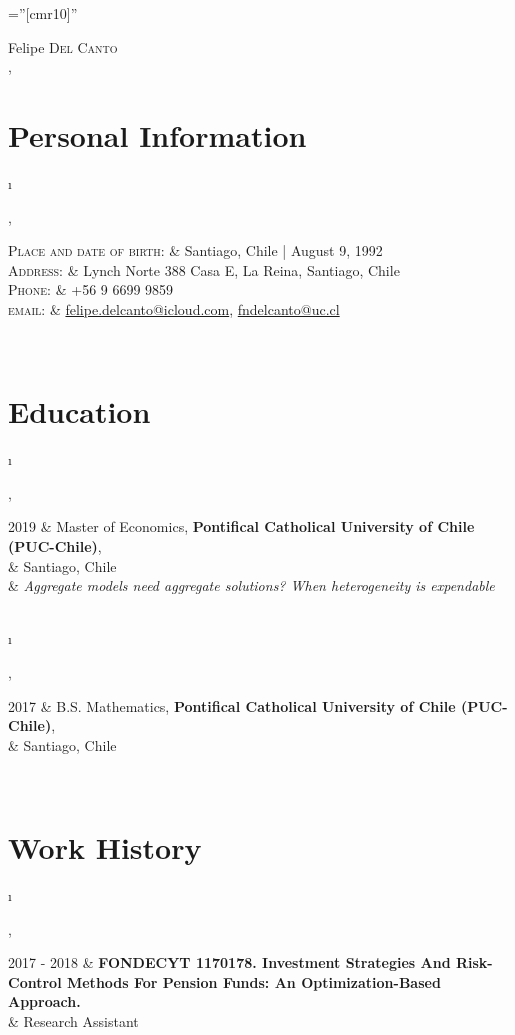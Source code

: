 \documentclass[a4paper,10pt]{article}
\newcommand{\tablength}{}
\newcommand{\setTabParams}[1]{\renewcommand\tablength{}\forcsvlist{\listadd\tablength}{#1}}
\newcommand{\setCols}[1]{			%
	\ifnum0=\i						%
		\ifdim0cm=#1				%
			\def \firstCol {r}		%
		\else						%
			\def \firstCol {p{#1}}		%
		\fi						%
	\else \ifnum1=\i				%
		\ifdim0cm=#1				%
			\def \secondCol {l}		%
		\else						%
			\def \secondCol{p{#1}}	%
		\fi						%
	\else \ifnum2=\i				%
		\ifnum0=#1				%
			\def \sep {}			%
		\else						%
			\def \sep {|}			%
		\fi						%
	\fi \fi \fi						%
	\advance\i by1					%
}
\newcommand{\tab}[1]{					%
	\newcount\i						%
	\forlistloop{\setCols}{\tablength}		%
	\begin{tabular}{\firstCol \sep \secondCol}	%
		#1							%
	\end{tabular} \\						%
}
\begin{document}
\pagestyle{empty} %

\font\fb=''[cmr10]'' %

\par{\centering
		{{\Huge Felipe \textsc{Del Canto}}	\\
		 {\large \monthname, \the\year }
	}\par}

\section{Personal Information}
\setTabParams{0cm,0cm,0}

\tab{
    \textsc{Place and date of birth:}	&	Santiago, Chile  | August 9, 1992								\\
    \textsc{Address:}   			&	Lynch Norte 388 Casa E, La Reina, Santiago, Chile					\\
    \textsc{Phone:}	   			&	+56 9 6699 9859											\\
    \textsc{email:}     				&	\href{mailto:felipe.delcanto@icloud.com}{felipe.delcanto@icloud.com},
    								\href{mailto:fndelcanto@uc.cl}{fndelcanto@uc.cl}
}

\section{Education}
\setTabParams{0cm,0cm,0}

\tab{
\textsc{2019}
	& Master of Economics, \textbf{Pontifical Catholical University of Chile (PUC-Chile)},		\\
	& Santiago, Chile														\\
	& \emph{Aggregate models need aggregate solutions? When heterogeneity is expendable}	\\
}

\tab{
\textsc{2017}
	& B.S. Mathematics, \textbf{Pontifical Catholical University of Chile (PUC-Chile)},			\\
	& Santiago, Chile\\
}

\section{Work History}
\setTabParams{0cm,11cm,1}

\tab{
\textsc{2017 - 2018}
 	&	\textbf{FONDECYT 1170178. Investment Strategies And Risk-Control Methods For Pension Funds: An Optimization-Based Approach.}	\\
	&	Research Assistant \\
}
\end{document}
